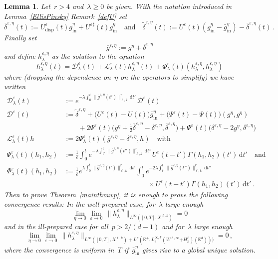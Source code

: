 \documentclass[11pt]{article}
\newtheorem{lemm}[theo]{Lemma}
\theoremstyle{definition}
\numberwithin{equation}{section}
\numberwithin{figure}{section}
\numberwithin{table}{section}
\newcommand*{\dd}{\mathrm{d}}
\newcommand*{\dt}{\dd t}
\newcommand*\R {\mathbb{R}}
\newcommand*\eps{{\varepsilon}}
\newcommand*\e{{\varepsilon}}
\DeclareMathOperator{\inn}{in}
\DeclareMathOperator{\disp}{disp}
\begin{document}
\begin{lemm}\label{lem:reduction}
Let~$r >4$ and~$\lambda \geq 0$ be given. With the notation introduced in Lemma~\ref{EllisPinsky} Remark~\ref{defU} set
\[
\overline\delta^{\eps,\eta} (t) :=U^\eps_{\disp}(t) g^\eta_{\inn} + U^{\eps \sharp}(t)g^\eta_{\inn} \quad \text{and}\quad\widetilde \delta^{\eps,\eta} (t) := U^\eps(t) (g_{\inn}^\eta - \bar g^\eta_{\inn}) - \overline\delta^{\eps,\eta} (t) \,.
\]
Finally set
\[
\overline g^{\eps,\eta}:=g^\eta + \overline\delta^{\eps,\eta}
\]
and define $h^{\e,\eta}_\lambda$ as the solution to the equation
\begin{equation}\label{equationhepsetalambda}
h^{\e,\eta}_\lambda(t) = \mathcal{D}_\lambda^{\e}(t) + \mathcal{L}_\lambda^{\e}(t) h^{\e,\eta}_\lambda(t) + \Phi^\e_\lambda(t) (h^{\e,\eta}_\lambda,h^{\e,\eta}_\lambda)
\end{equation}
where (dropping the dependence on~$\eta$ on the operators to simplify) we have written
\begin{equation}\label{defopslambda}
\begin{aligned}
\mathcal{D}_\lambda^\e (t) & := e^{-\lambda \int_0^t \|\overline g^{\eps,\eta}(t')\|_{\ell,k}^r\, \dt' \, } \mathcal{D}^\e (t) \\
\mathcal{D}^\e (t) & := \widetilde \delta^{\eps,\eta} + \big(U^\eps (t) - U (t)\big)\bar g^\eta_{\inn} + \big(\Psi^\eps (t) - \Psi(t) \big) (g^\eta,g^\eta)
\\
& \qquad + 2 \Psi^\eps (t) \Big({g^\eta+\frac 12 \overline\delta^{\eps,\eta}}- \delta^{\eps,\eta}, \overline\delta^{\eps,\eta}\Big) +\Psi^\eps (t)
\big(\delta^{\eps,\eta} -2g^\eta, \delta^{\eps,\eta} \big) \\
\mathcal{L}^\e _\lambda (t) h& := 2\Psi_\lambda^{\e}(t) (\overline g^{\eps,\eta}- \delta^{\eps,\eta},h) \quad\text{with} \\
\Psi_\lambda^{\e }(t) (h_1,h_2) &:=\frac1\e
\int_0^t e^{- \lambda \int_{t'}^t \|\overline g^{\eps,\eta}(t'')\|_{\ell,k}^r\, \dt'' } U^\eps(t-t')\Gamma (h_1,h_2) (t')\, \dt' \quad \text{and}
\\
\Phi_\lambda^{\e }(t) (h_1,h_2) &:=\frac1\e e^{\lambda \int_0^t \|\overline g^{\eps,\eta}(t')\|_{\ell,k}^r\, \dt' }
\int_0^t e^{-2\lambda \int_{t'}^t \|\overline g^{\eps,\eta}(t'')\|_{\ell,k}^r\, \dt'' } \\
&\qquad\qquad\qquad\qquad\qquad\qquad\times U^\eps(t-t')\Gamma (h_1,h_2) (t')\, \dt'
\,.
\end{aligned}
\end{equation}
Then to prove Theorem~\ref{mainthmwp}, it is enough to prove the following convergence results: In the well-prepared case, for~$\lambda$ large enough
\[
\lim_{\eta\to 0} \lim_{\eps\to 0} \, \big\| h^{\eps,\eta}_\lambda
\big\|_{L^\infty([0,T],X^{\ell,k})} = 0
\]
and in the ill-prepared case for all~$p>2/(d-1)$ and for~$\lambda$ large enough
\[
\lim_{\eta\to 0} \lim_{\eps\to 0} \, \big\| h^{\eps,\eta}_\lambda
\big\|_{L^\infty([0,T],X^{\ell,k})+ {L^p(\R^+,L^{\infty,k}_v(W^{\ell,\infty}{+ H^\ell_x})(\R^d)))}} = 0 \,,
\]
where the convergence is uniform in~$T$ if~$\bar g_{\inn}^\eta$ gives rise to a global unique solution.
\end{lemm}
\end{document}
